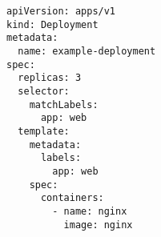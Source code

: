 \begin{verbatim}
apiVersion: apps/v1
kind: Deployment
metadata:
  name: example-deployment
spec:
  replicas: 3
  selector:
    matchLabels:
      app: web
  template:
    metadata:
      labels:
        app: web
    spec:
      containers:
        - name: nginx
          image: nginx
\end{verbatim}